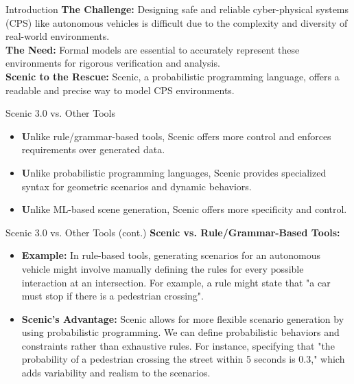 \documentclass{beamer}
\begin{document}
\begin{frame}{Introduction}
    \textbf{The Challenge:} Designing safe and reliable cyber-physical systems (CPS) like autonomous vehicles is difficult due to the complexity and diversity of real-world environments.\\
    \textbf{The Need:} Formal models are essential to accurately represent these environments for rigorous verification and analysis.\\
    \textbf{Scenic to the Rescue:} Scenic, a probabilistic programming language, offers a readable and precise way to model CPS environments.
\end{frame}

\begin{frame}{Scenic 3.0 vs. Other Tools}
    \begin{itemize}
        \setlength{\itemindent}{-1em} 
        \item \textbf Unlike rule/grammar-based tools, Scenic offers more control and enforces requirements over generated data.
        \item \textbf Unlike probabilistic programming languages, Scenic provides specialized syntax for geometric scenarios and dynamic behaviors.
        \item \textbf Unlike ML-based scene generation, Scenic offers more specificity and control.
    \end{itemize}
\end{frame}

\begin{frame}{Scenic 3.0 vs. Other Tools (cont.)}
    \textbf{Scenic vs. Rule/Grammar-Based Tools:}\\
    \begin{itemize}
        \setlength{\itemindent}{-1em} 
        \item \textbf{Example:} In rule-based tools, generating scenarios for an autonomous vehicle might involve manually defining the rules for every possible interaction at an intersection. For example, a rule might state that "a car must stop if there is a pedestrian crossing".
        \item \textbf {Scenic's Advantage:} Scenic allows for more flexible scenario generation by using probabilistic programming. We can define probabilistic behaviors and constraints rather than exhaustive rules. For instance, specifying that "the probability of a pedestrian crossing the street within 5 seconds is 0.3," which adds variability and realism to the scenarios.
    \end{itemize}
\end{frame}
\end{document}
